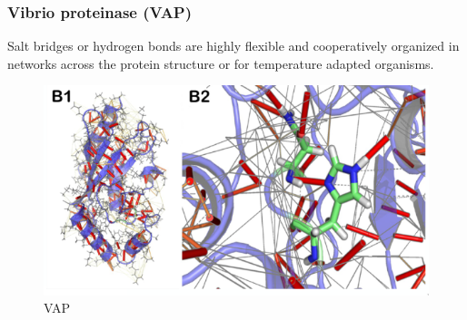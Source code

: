 		\subsubsection{Vibrio proteinase (VAP)}
		Salt bridges or hydrogen bonds are highly flexible and cooperatively organized in networks across the protein structure or for temperature adapted organisms.

		\begin{figure}[H]
			\includegraphics[width=\textwidth]{vap}
			\caption{VAP}
			\label{fig:vap}
		\end{figure}
